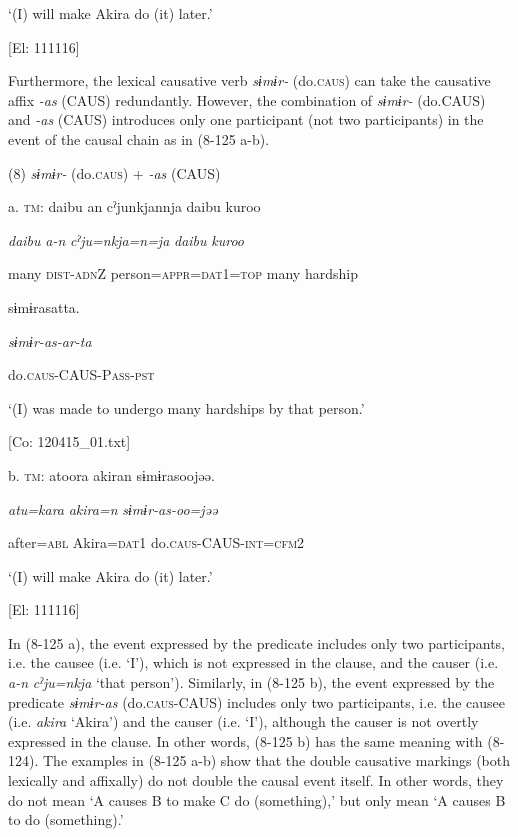     ‘(I) will make Akira do (it) later.’

    [El: 111116]

Furthermore, the lexical causative verb \textit{sɨmɨr-} (do.\textsc{caus}) can take the causative affix \textit{{}-as} (CAUS) redundantly. However, the combination of \textit{sɨmɨr-} (do.CAUS) and \textit{{}-as} (CAUS) introduces only one participant (not two participants) in the event of the causal chain as in (8-125 a-b).

(8)  \textit{sɨmɨr-} (do.\textsc{caus}) + \textit{{}-as} (CAUS)

  a.  \textsc{tm}:  {\textbar}daibu{\textbar}  an  cˀjunkjannja  {\textbar}daibu  kuroo{\textbar}

      \textit{daibu}  \textit{a-n}  \textit{cˀju=nkja=n=ja}  \textit{daibu}  \textit{kuroo}

      many  \textsc{dist}-\textsc{adn}Z  person=\textsc{appr}=\textsc{dat}1=\textsc{top}  many  hardship

      sɨmɨrasatta.

      \textit{sɨmɨr-as-ar-ta}

      do.\textsc{caus}-CAUS-P\textsc{ass}-\textsc{pst}

      ‘(I) was made to undergo many hardships by that person.’

      [Co: 120415\_01.txt]

  b.  \textsc{tm}:  atoora  akiran  sɨmɨrasoojəə.

      \textit{atu=kara}  \textit{akira=n}  \textit{sɨmɨr-as-oo=jəə}

      after=\textsc{abl}  Akira=\textsc{dat}1  do.\textsc{caus}-CAUS-\textsc{int}=\textsc{cfm}2

      ‘(I) will make Akira do (it) later.’

      [El: 111116]

In (8-125 a), the event expressed by the predicate includes only two participants, i.e. the causee (i.e. ‘I’), which is not expressed in the clause, and the causer (i.e. \textit{a-n} \textit{cˀju=nkja} ‘that person’). Similarly, in (8-125 b), the event expressed by the predicate \textit{sɨmɨr-as} (do.\textsc{caus}-CAUS) includes only two participants, i.e. the causee (i.e. \textit{akira} ‘Akira’) and the causer (i.e. ‘I’), although the causer is not overtly expressed in the clause. In other words, (8-125 b) has the same meaning with (8-124). The examples in (8-125 a-b) show that the double causative markings (both lexically and affixally) do not double the causal event itself. In other words, they do not mean ‘A causes B to make C do (something),’ but only mean ‘A causes B to do (something).’

